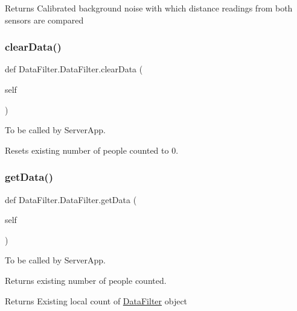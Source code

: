 \begin{DoxyReturn}{Returns}
Calibrated background noise with which distance readings from both sensors are compared 
\end{DoxyReturn}
\mbox{\label{class_data_filter_1_1_data_filter_a2b121b53a52353af961ce977449e4bfa}} 
\subsubsection{\texorpdfstring{clear\+Data()}{clearData()}}
{\footnotesize\ttfamily def Data\+Filter.\+Data\+Filter.\+clear\+Data (\begin{DoxyParamCaption}\item[{}]{self }\end{DoxyParamCaption})}



To be called by Server\+App. 

Resets existing number of people counted to 0. \mbox{\label{class_data_filter_1_1_data_filter_ae58c36c4343d52baf699c2ce68fbb784}} 
\subsubsection{\texorpdfstring{get\+Data()}{getData()}}
{\footnotesize\ttfamily def Data\+Filter.\+Data\+Filter.\+get\+Data (\begin{DoxyParamCaption}\item[{}]{self }\end{DoxyParamCaption})}



To be called by Server\+App. 

Returns existing number of people counted.

\begin{DoxyReturn}{Returns}
Existing local count of \mbox{\hyperlink{class_data_filter_1_1_data_filter}{Data\+Filter}} object 
\end{DoxyReturn}
\mbox{\label{class_data_filter_1_1_data_filter_afed5beb108e5fc193a7d8de6b183c047}} 

